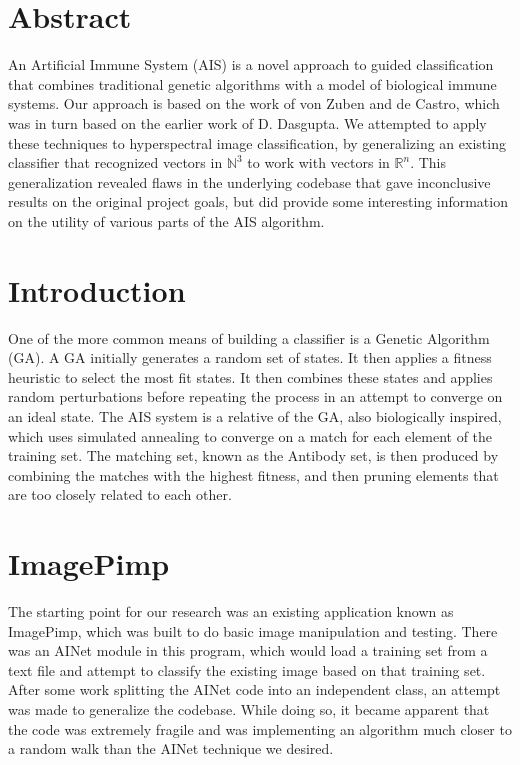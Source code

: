 \documentclass{article}
\title{\Title}
\author{\Author}
\date{\Date}
\theoremstyle{plain} %
\theoremstyle{remark}
\begin{document}
\maketitle
\section{Abstract}
An Artificial Immune System (AIS) is a novel approach to guided
classification that combines traditional genetic algorithms with a model
of biological immune systems. Our approach is based on the work of
von Zuben and de Castro\cite{decastro}, which was in turn based on the
earlier work of D. Dasgupta\cite{dasgupta}. We attempted to apply these
techniques to hyperspectral image classification, by generalizing an
existing classifier that recognized vectors in $\mathbb{N}^3$ to work with
vectors in $\mathbb{R}^n$. This generalization revealed flaws in the underlying
codebase that gave inconclusive results on the original project goals,
but did provide some interesting information on the utility of various
parts of the AIS algorithm.

\section{Introduction}
One of the more common means of building a classifier is a Genetic
Algorithm (GA). A GA initially generates a random set of states. It then
applies a fitness heuristic to select the most fit states. It then
combines these states and applies random perturbations before repeating
the process in an attempt to converge on an ideal state\cite{norvig}.
The AIS system is a relative of the GA, also biologically inspired,
which uses simulated annealing to converge on a match for each element
of the training set. The matching set, known as the Antibody set, is
then produced by combining the matches with the highest fitness, and
then pruning elements that are too closely related to each other. 

\section{ImagePimp}
The starting point for our research was an existing application known as
ImagePimp, which was built to do basic image manipulation and testing.
There was an AINet module in this program, which would load a training
set from a text file and attempt to classify the existing image based on
that training set. After some work splitting the AINet code into an
independent class, an attempt was made to generalize the codebase. While
doing so, it became apparent that the code was extremely fragile and was
implementing an algorithm much closer to a random walk than the AINet
technique we desired.
\end{document}
